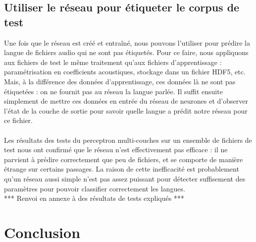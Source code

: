 \documentclass{article}
\begin{document}
\subsection{Utiliser le réseau pour étiqueter le corpus de test}

Une fois que le réseau est créé et entraîné, nous pouvons l'utiliser pour prédire la langue de fichiers audio qui ne sont pas étiquetés. Pour ce faire, nous appliquons aux fichiers de test le même traitement qu'aux fichiers d'apprentissage : paramétrisation en coefficients acoustiques, stockage dans un fichier HDF5, etc. Mais, à la différence des données d'apprentissage, ces données là ne sont pas étiquetées : on ne fournit pas au réseau la langue parlée. Il suffit ensuite simplement de mettre ces données en entrée du réseau de neurones et d'observer l'état de la couche de sortie pour savoir quelle langue a prédit notre réseau pour ce fichier.\\
 \\
Les résultats des tests du perceptron multi-couches sur un ensemble de fichiers de test nous ont confirmé que le réseau n'est effectivement pas efficace : il ne parvient à prédire correctement que peu de fichiers, et se comporte de manière étrange sur certains passages. La raison de cette inefficacité est probablement qu'un réseau aussi simple n'est pas assez puissant pour détecter suffisement des paramètres pour pouvoir classifier correctement les langues.\\ *** Renvoi en annexe à des résultats de tests expliqués ***\\

\section{Conclusion}



\end{document}

